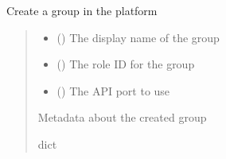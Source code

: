 \documentclass[letterpaper,10pt,english]{sphinxmanual}
\begin{document}
\begin{fulllineitems}
\begin{fulllineitems}
\label{\detokenize{aisquared.platform:aisquared.platform.AISquaredPlatformClient.AISquaredPlatformClient.create_group}}
\pysigstartsignatures
{}
\pysigstopsignatures
\sphinxAtStartPar
Create a group in the platform
\begin{quote}\begin{description}
\begin{itemize}
\item {} 
\sphinxAtStartPar
{} () \textendash{} The display name of the group

\item {} 
\sphinxAtStartPar
{} () \textendash{} The role ID for the group

\item {} 
\sphinxAtStartPar
{} (\sphinxstyleliteralemphasis{\sphinxupquote{ (}}\sphinxstyleliteralemphasis{\sphinxupquote{)}}) \textendash{} The API port to use

\end{itemize}

\sphinxAtStartPar
{} \textendash{} Metadata about the created group

\sphinxAtStartPar
dict

\end{description}\end{quote}

\end{fulllineitems}



\end{fulllineitems}
\end{document}
